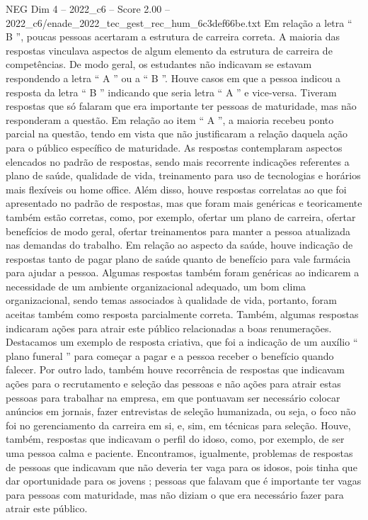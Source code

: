 \begin{textsample}{NEG Dim 4 – 2022\_c6 – Score 2.00 – 2022\_c6/enade\_2022\_tec\_gest\_rec\_hum\_6c3def66be.txt}
Em relação a letra “ B ”, poucas pessoas acertaram a estrutura de carreira correta.
A maioria das respostas vinculava aspectos de algum elemento da estrutura de carreira de competências.
De modo geral, os estudantes não indicavam se estavam respondendo a letra “ A ” ou a “ B ”.
Houve casos em que a pessoa indicou a resposta da letra “ B ” indicando que seria letra “ A ” e vice-versa.
Tiveram respostas que só falaram que era importante ter pessoas de maturidade, mas não responderam a questão.
Em relação ao item “ A ”, a maioria recebeu ponto parcial na questão, tendo em vista que não justificaram a relação daquela ação para o público específico de maturidade.
As respostas contemplaram aspectos elencados no padrão de respostas, sendo mais recorrente indicações referentes a plano de saúde, qualidade de vida, treinamento para uso de tecnologias e horários mais flexíveis ou home office.
Além disso, houve respostas correlatas ao que foi apresentado no padrão de respostas, mas que foram mais genéricas e teoricamente também estão corretas, como, por exemplo, ofertar um plano de carreira, ofertar benefícios de modo geral, ofertar treinamentos para manter a pessoa atualizada nas demandas do trabalho.
Em relação ao aspecto da saúde, houve indicação de respostas tanto de pagar plano de saúde quanto de benefício para vale farmácia para ajudar a pessoa.
Algumas respostas também foram genéricas ao indicarem a necessidade de um ambiente organizacional adequado, um bom clima organizacional, sendo temas associados à qualidade de vida, portanto, foram aceitas também como resposta parcialmente correta.
Também, algumas respostas indicaram ações para atrair este público relacionadas a boas renumerações.
Destacamos um exemplo de resposta criativa, que foi a indicação de um auxílio “ plano funeral ” para começar a pagar e a pessoa receber o benefício quando falecer.
Por outro lado, também houve recorrência de respostas que indicavam ações para o recrutamento e seleção das pessoas e não ações para atrair estas pessoas para trabalhar na empresa, em que pontuavam ser necessário colocar anúncios em jornais, fazer entrevistas de seleção humanizada, ou seja, o foco não foi no gerenciamento da carreira em si, e, sim, em técnicas para seleção.
Houve, também, respostas que indicavam o perfil do idoso, como, por exemplo, de ser uma pessoa calma e paciente.
Encontramos, igualmente, problemas de respostas de pessoas que indicavam que não deveria ter vaga para os idosos, pois tinha que dar oportunidade para os jovens ; pessoas que falavam que é importante ter vagas para pessoas com maturidade, mas não diziam o que era necessário fazer para atrair este público.

\end{textsample}
